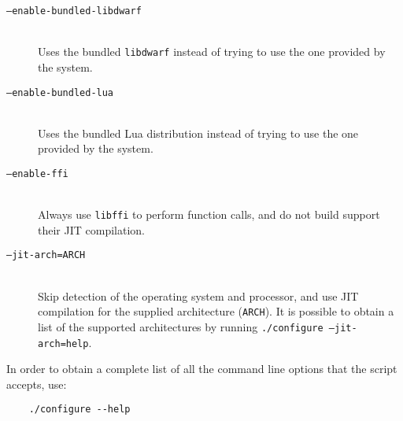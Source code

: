 \begin{description}

	\item [\texttt{--enable-bundled-libdwarf}] \hfill\\
		Uses the bundled \verb|libdwarf| instead of trying to use the one
		provided by the system.

	\item [\texttt{--enable-bundled-lua}] \hfill\\
		Uses the bundled Lua distribution instead of trying to use the one
		provided by the system.

	\item [\texttt{--enable-ffi}] \hfill\\
		Always use \verb|libffi| to perform function calls, and do not build
		support their JIT compilation.

	\item [\texttt{--jit-arch=ARCH}] \hfill\\
		Skip detection of the operating system and processor, and use JIT
		compilation for the supplied architecture (\verb|ARCH|). It is
		possible to obtain a list of the supported architectures by running
		\texttt{./configure --jit-arch=help}.

\end{description}

In order to obtain a complete list of all the command line options that the
script accepts, use:

\begin{verbatim}
	./configure --help
\end{verbatim}
